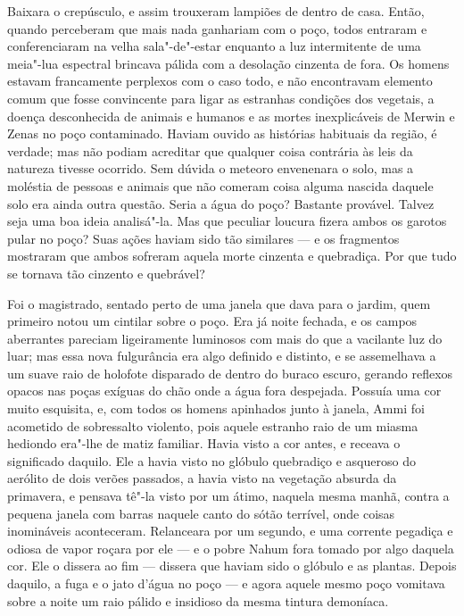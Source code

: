 Baixara o crepúsculo, e assim trouxeram lampiões de dentro de casa.
Então, quando perceberam que mais nada ganhariam com o poço, todos
entraram e conferenciaram na velha sala"-de"-estar enquanto a luz
intermitente de uma meia"-lua espectral brincava pálida com a desolação
cinzenta de fora. Os homens estavam francamente perplexos com o caso
todo, e não encontravam elemento comum que fosse convincente para ligar
as estranhas condições dos vegetais, a doença desconhecida de animais e
humanos e as mortes inexplicáveis de Merwin e Zenas no poço contaminado.
Haviam ouvido as histórias habituais da região, é verdade; mas não
podiam acreditar que qualquer coisa contrária às leis da natureza
tivesse ocorrido. Sem dúvida o meteoro envenenara o solo, mas a moléstia
de pessoas e animais que não comeram coisa alguma nascida daquele solo
era ainda outra questão. Seria a água do poço? Bastante provável. Talvez
seja uma boa ideia analisá"-la. Mas que peculiar loucura fizera ambos os
garotos pular no poço? Suas ações haviam sido tão similares
--- e os fragmentos mostraram que
ambos sofreram aquela morte cinzenta e quebradiça. Por que tudo se
tornava tão cinzento e quebrável?

Foi o magistrado, sentado perto de uma janela que dava para o jardim,
quem primeiro notou um cintilar sobre o poço. Era já noite fechada, e os
campos aberrantes pareciam ligeiramente luminosos com mais do que a
vacilante luz do luar; mas essa nova fulgurância era algo definido e
distinto, e se assemelhava a um suave raio de holofote disparado de
dentro do buraco escuro, gerando reflexos opacos nas poças exíguas do
chão onde a água fora despejada. Possuía uma cor muito esquisita, e, com
todos os homens apinhados junto à janela, Ammi foi acometido de
sobressalto violento, pois aquele estranho raio de um miasma hediondo
era"-lhe de matiz familiar. Havia visto a cor antes, e receava o
significado daquilo. Ele a havia visto no glóbulo quebradiço e asqueroso
do aerólito de dois verões passados, a havia visto na vegetação absurda
da primavera, e pensava tê"-la visto por um átimo, naquela mesma manhã,
contra a pequena janela com barras naquele canto do sótão terrível, onde
coisas inomináveis aconteceram. Relanceara por um segundo, e uma
corrente pegadiça e odiosa de vapor roçara por ele
--- e o pobre Nahum fora tomado
por algo daquela cor. Ele o dissera ao fim --- dissera que haviam sido o
glóbulo e as plantas. Depois daquilo, a fuga e o jato d'água no poço
--- e agora aquele mesmo poço
vomitava sobre a noite um raio pálido e insidioso da mesma tintura
demoníaca.

